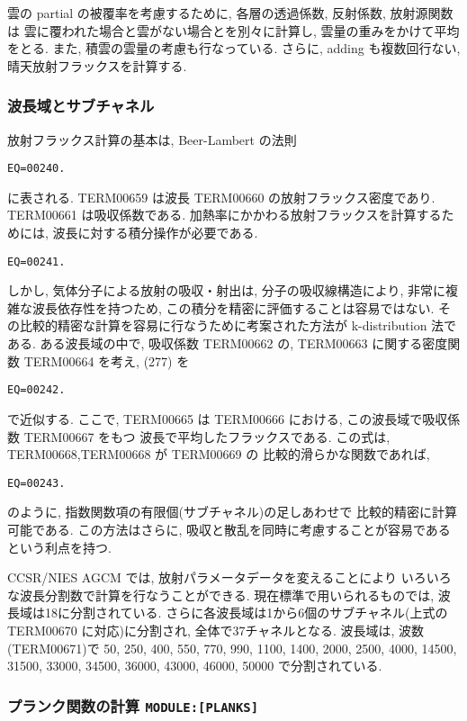 雲の partial の被覆率を考慮するために,
各層の透過係数, 反射係数, 放射源関数は
雲に覆われた場合と雲がない場合とを別々に計算し,
雲量の重みをかけて平均をとる.
また, 積雲の雲量の考慮も行なっている.
さらに, adding も複数回行ない, 晴天放射フラックスを計算する.

\subsubsection{波長域とサブチャネル}

放射フラックス計算の基本は,
Beer-Lambert の法則
\begin{verbatim}
EQ=00240.
\end{verbatim}
に表される. TERM00659 は波長 TERM00660 の放射フラックス密度であり.
TERM00661 は吸収係数である.
加熱率にかかわる放射フラックスを計算するためには,
波長に対する積分操作が必要である.
%
\begin{verbatim}
EQ=00241.
\end{verbatim}
%
しかし, 気体分子による放射の吸収・射出は,
分子の吸収線構造により, 非常に複雑な波長依存性を持つため,
この積分を精密に評価することは容易ではない.
その比較的精密な計算を容易に行なうために考案された方法が
k-distribution 法である.
ある波長域の中で, 吸収係数 TERM00662 の,
TERM00663 に関する密度関数 TERM00664 を考え,
(277) を
\begin{verbatim}
EQ=00242.
\end{verbatim}
で近似する. ここで, TERM00665 は
TERM00666 における, この波長域で吸収係数 TERM00667 をもつ
波長で平均したフラックスである.
この式は, TERM00668,TERM00668 が TERM00669 の
比較的滑らかな関数であれば, 
\begin{verbatim}
EQ=00243.
\end{verbatim}
のように, 指数関数項の有限個(サブチャネル)の足しあわせで
比較的精密に計算可能である.
この方法はさらに,
吸収と散乱を同時に考慮することが容易であるという利点を持つ.

CCSR/NIES AGCM では,
放射パラメータデータを変えることにより
いろいろな波長分割数で計算を行なうことができる.
現在標準で用いられるものでは,
波長域は18に分割されている.
さらに各波長域は1から6個のサブチャネル(上式の TERM00670 に対応)に分割され,
全体で37チャネルとなる.
波長域は, 波数(TERM00671)で
50, 250, 400, 550, 770, 990, 1100, 1400, 2000,
2500, 4000, 14500, 31500, 33000, 34500, 36000, 43000, 46000, 50000
で分割されている.

\subsubsection{プランク関数の計算 \texttt{MODULE:[PLANKS]}}

